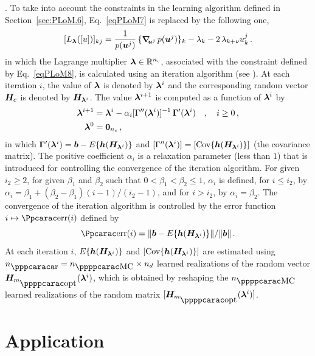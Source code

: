 .
To take into account the constraints in the learning algorithm defined in Section~\ref{sec:PLoM.6}, Eq.~\eqref{eqPLoM7} is replaced by the following one,
%
\begin{equation} \nonumber
[L_{\boldsymbol{\lambda}}([u])]_{kj}  = \frac{1}{p({\boldsymbol{u}}^j)} \, \{{\boldsymbol{\nabla}}_{\!\!{\boldsymbol{u}}^j}\, p({\boldsymbol{u}}^j) \}_k 
             - \lambda_k -2\, \lambda_{k+\nu} u_k^j\, .
\end{equation}
%
in which the Lagrange multiplier ${\boldsymbol{\lambda}}\in{\mathbb{R}}^{n_c}$, associated with the constraint defined by Eq.~\eqref{eqPLoM8}, is calculated
using an iteration algorithm (see \cite{Soize2022b}).  
At each iteration $i$, the value of ${\boldsymbol{\lambda}}$ is denoted by ${\boldsymbol{\lambda}}^i$ and the corresponding random vector ${\boldsymbol{H}}_c$ is denoted by
${\boldsymbol{H}}_{{\boldsymbol{\lambda}}^i}$.  The value ${\boldsymbol{\lambda}}^{i+1}$ is computed as a function of ${\boldsymbol{\lambda}}^i$ by
%
\begin{align} \nonumber
{\boldsymbol{\lambda}}^{i+1} & = {\boldsymbol{\lambda}}^i -\alpha_i [\Gamma''({\boldsymbol{\lambda}}^i)]^{-1}\, {\mathbf{\Gamma}}'({\boldsymbol{\lambda}}^i) \quad , \quad i \geq 0 \, ,\nonumber \\
{\boldsymbol{\lambda}}^0         & = { \hbox{\bf 0} }_{n_c} \, , \nonumber 
\end{align}
%
in which ${\mathbf{\Gamma}}'({\boldsymbol{\lambda}}^i) = {\boldsymbol{b}} - E\{{\boldsymbol{h}}({\boldsymbol{H}}_{{\boldsymbol{\lambda}}^i})\}$ and
$[\Gamma''({\boldsymbol{\lambda}}^i)] = [\text{Cov}\{{\boldsymbol{h}}({\boldsymbol{H}}_{{\boldsymbol{\lambda}}^i})\}]$ (the covariance matrix). The positive coefficient $\alpha_i$ is a relaxation parameter (less than $1$) that is introduced for controlling the convergence of the iteration algorithm.
For given $i_2 \geq 2$, for given $\beta_1$ and $\beta_2$ such that $0 < \beta_1 < \beta_2 \leq 1$, $\alpha_i$ is defined,
for  $i \leq i_2$,  by $\alpha_i =  \beta_1 +(\beta_2-\beta_1)(i-1)/(i_2-1)$, and
for $i > i_2$, by $\alpha_i = \beta_2$.
The convergence of the iteration algorithm is controlled by the error function $i\mapsto \err(i)$  defined by
%
\begin{equation} \label{eqPLoM11}
\err(i) =  \Vert \bfb - E\{\bfh(\bfH_{\bflambda^i})\} \Vert / \Vert \bfb\Vert \, .
\end{equation}
%
At each iteration $i$, $E\{{\boldsymbol{h}}({\boldsymbol{H}}_{{\boldsymbol{\lambda}}^i})\}$ and $[\text{Cov}\{{\boldsymbol{h}}({\boldsymbol{H}}_{{\boldsymbol{\lambda}}^i})\}]$ are estimated using $n_\ar = n_\MC \times n_d$ learned realizations of the random vector $\bfH_{m_\popt}(\bflambda^i)$, which is obtained by reshaping the $n_\MC$ learned realizations of the random matrix $[\bfH_{m_\popt}(\bflambda^i)]$.

\section{Application}\label{sec:application}
